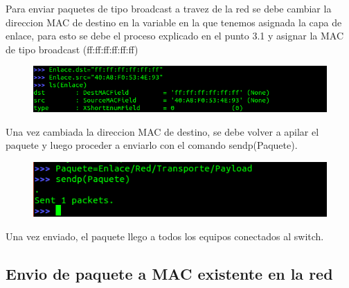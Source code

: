\documentclass[spanish]{udpreport}
\begin{document}
Para enviar paquetes de tipo broadcast a travez de la red se debe cambiar la direccion MAC de destino en la variable en la que tenemos asignada la capa de enlace, para esto se debe el proceso explicado en el punto 3.1 y asignar la MAC  de tipo broadcast (ff:ff:ff:ff:ff:ff)\\
\begin{figure}[H]
\begin{center}
\includegraphics[scale=0.7]{images/switch1.png}
\end{center}
\end{figure}
Una vez cambiada la direccion MAC de destino, se debe volver a apilar el paquete y luego proceder a enviarlo con el comando sendp(Paquete).\\
\begin{figure}[H]
\begin{center}
\includegraphics[scale=0.7]{images/switch2.png}
\end{center}
\end{figure}

Una vez enviado, el paquete llego a todos los equipos conectados al switch.

\subsection{Envio de paquete a MAC existente en la red}
\end{document}
